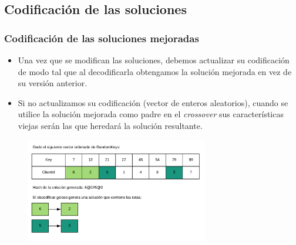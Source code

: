 \documentclass{beamer}
\begin{document}

\subsection{Codificación de las soluciones}

\begin{frame}
\frametitle{Codificación de las soluciones mejoradas}

\begin{itemize}
    \item Una vez que se modifican las soluciones, debemos actualizar su codificación de modo tal que al decodificarla obtengamos la solución mejorada en vez de su versión anterior.
    \pause
    \item Si no actualizamos su codificación (vector de enteros aleatorios), cuando se utilice la solución mejorada como padre en el \textit{crossover} sus características viejas serán las que heredará la solución resultante.
    \pause
\end{itemize}

\begin{figure}[h]
	\centering
	\includegraphics[width=8cm]{codificacionDeSolucionParteUno}
	\label{fig:codificacionDeSolucionParteUno}
\end{figure}

\end{frame}

\end{document}

